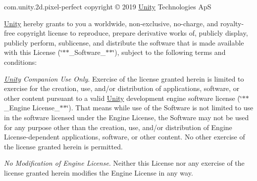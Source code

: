 com.\+unity.\+2d.\+pixel-\/perfect copyright © 2019 \mbox{\hyperlink{namespace_unity}{Unity}} Technologies ApS

\mbox{\hyperlink{namespace_unity}{Unity}} hereby grants to you a worldwide, non-\/exclusive, no-\/charge, and royalty-\/free copyright license to reproduce, prepare derivative works of, publicly display, publicly perform, sublicense, and distribute the software that is made available with this License (\char`\"{}$\ast$$\ast$\+\_\+\+Software\+\_\+$\ast$$\ast$\char`\"{}), subject to the following terms and conditions\+:


\begin{DoxyEnumerate}
\item {\itshape \mbox{\hyperlink{namespace_unity}{Unity}} Companion Use Only}. Exercise of the license granted herein is limited to exercise for the creation, use, and/or distribution of applications, software, or other content pursuant to a valid \mbox{\hyperlink{namespace_unity}{Unity}} development engine software license (\char`\"{}$\ast$$\ast$\+\_\+\+Engine License\+\_\+$\ast$$\ast$\char`\"{}). That means while use of the Software is not limited to use in the software licensed under the Engine License, the Software may not be used for any purpose other than the creation, use, and/or distribution of Engine License-\/dependent applications, software, or other content. No other exercise of the license granted herein is permitted.
\end{DoxyEnumerate}
\begin{DoxyEnumerate}
\item {\itshape No Modification of Engine License}. Neither this License nor any exercise of the license granted herein modifies the Engine License in any way.
\end{DoxyEnumerate}
